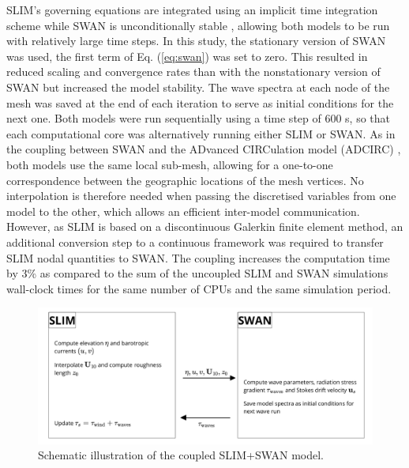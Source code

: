SLIM's governing equations are integrated using an implicit time integration scheme while SWAN is unconditionally stable \citep{dietrich2012performance}, allowing both models to be run with relatively large time steps. In this study, the stationary version of SWAN was used, \ie the first term of Eq. (\ref{eq:swan}) was set to zero. This resulted in reduced scaling and convergence rates than with the nonstationary version of SWAN but increased the model stability. The wave spectra at each node of the mesh was saved at the end of each iteration to serve as initial conditions for the next one. Both models were run sequentially using a time step of 600 s, so that each computational core was alternatively running either SLIM or SWAN. As in the coupling between SWAN and the ADvanced CIRCulation model (ADCIRC) \citep{dietrich2012performance}, both models use the same local sub-mesh, allowing for a one-to-one correspondence between the geographic locations of the mesh vertices. No interpolation is therefore needed when passing the discretised variables from one model to the other, which allows an efficient inter-model communication. However, as SLIM is based on  a discontinuous Galerkin finite element method, an additional conversion step to a continuous framework was required to transfer SLIM nodal quantities to SWAN. The coupling increases the computation time by 3\% as compared to the sum of the uncoupled SLIM and SWAN simulations wall-clock times for the same number of CPUs and the same simulation period.


\begin{figure}
    \centering
    \includegraphics[width=.99\textwidth]{chapters/irma/figures/coupling_v2.png}
    \caption{Schematic illustration of the coupled SLIM+SWAN model.}
    \label{fig:coupling}
\end{figure}

